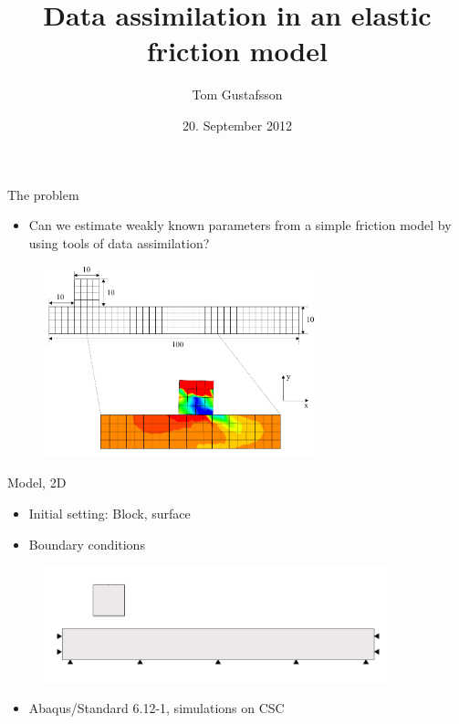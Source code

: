 \documentclass{beamer}
\title[Data assimilation in an elastic friction model]{Data assimilation in an elastic friction model}
\author{Tom Gustafsson}
\date{20. September 2012}
\begin{document}
\begin{frame}
\titlepage
\end{frame}

\begin{frame}{The problem}

\begin{itemize}
\item Can we estimate weakly known parameters from a simple friction model by using tools of data assimilation?
\end{itemize}

\begin{figure}
\includegraphics[width=8cm]{fretting_mesh.pdf}
\end{figure}

\end{frame}

\begin{frame}{Model, 2D}

\begin{itemize}
\item Initial setting: Block, surface
\item Boundary conditions
\end{itemize}

\begin{figure}
\includegraphics[width=10cm]{fretting_geom.pdf}
\end{figure}

\begin{itemize}
\item Abaqus/Standard 6.12-1, simulations on CSC
\end{itemize}

\end{frame}
\end{document}
